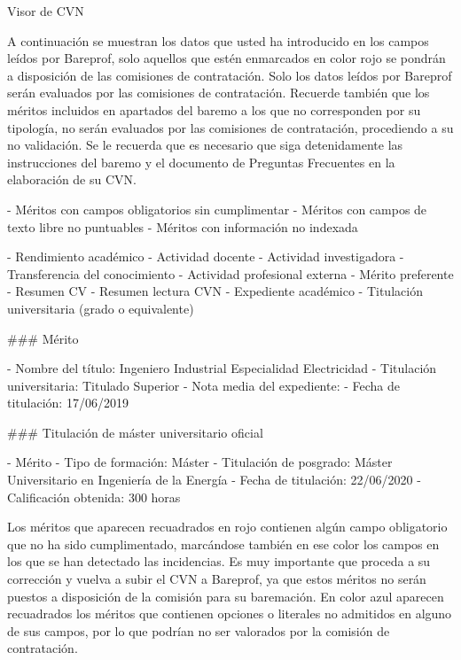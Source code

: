 \documentclass{article}
\begin{document}
\begin{itemize}
\begin{itemize}
\begin{scriptsize}
                  Visor de CVN

                  A continuación se muestran los datos que usted ha introducido en los campos leídos por Bareprof, solo aquellos que estén enmarcados en color rojo se pondrán a disposición de las comisiones de contratación. Solo los datos leídos por Bareprof serán evaluados por las comisiones de contratación. Recuerde también que los méritos incluidos en apartados del baremo a los que no corresponden por su tipología, no serán evaluados por las comisiones de contratación, procediendo a su no validación. Se le recuerda que es necesario que siga detenidamente las instrucciones del baremo y el documento de Preguntas Frecuentes en la elaboración de su CVN.

                  - Méritos con campos obligatorios sin cumplimentar
                  - Méritos con campos de texto libre no puntuables
                  - Méritos con información no indexada

                  - Rendimiento académico
                  - Actividad docente
                  - Actividad investigadora
                  - Transferencia del conocimiento
                  - Actividad profesional externa
                  - Mérito preferente
                  - Resumen CV
                  - Resumen lectura CVN
                  - Expediente académico
                  - Titulación universitaria (grado o equivalente)

                  \#\#\# Mérito

                  - Nombre del título: Ingeniero Industrial Especialidad Electricidad
                  - Titulación universitaria: Titulado Superior
                  - Nota media del expediente:
                  - Fecha de titulación: 17/06/2019

                  \#\#\# Titulación de máster universitario oficial

                  - Mérito
                  - Tipo de formación: Máster
                  - Titulación de posgrado: Máster Universitario en Ingeniería de la Energía
                  - Fecha de titulación: 22/06/2020
                  - Calificación obtenida: 300 horas

                  Los méritos que aparecen recuadrados en rojo contienen algún campo obligatorio que no ha sido cumplimentado, marcándose también en ese color los campos en los que se han detectado las incidencias. Es muy importante que proceda a su corrección y vuelva a subir el CVN a Bareprof, ya que estos méritos no serán puestos a disposición de la comisión para su baremación. En color azul aparecen recuadrados los méritos que contienen opciones o literales no admitidos en alguno de sus campos, por lo que podrían no ser valorados por la comisión de contratación.


\end{scriptsize}
\end{itemize}
\end{itemize}
\end{document}

